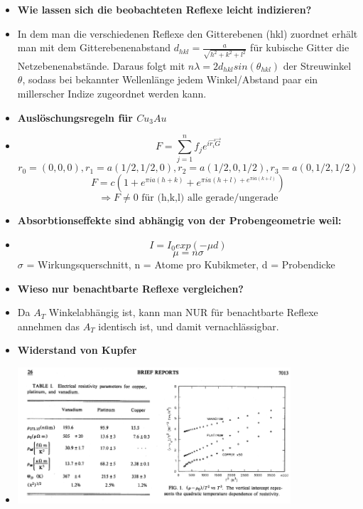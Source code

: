 \begin{itemize}
    \item \textbf{Wie lassen sich die beobachteten Reflexe leicht indizieren?}
    \item {In dem man die verschiedenen Reflexe den Gitterebenen (hkl) zuordnet erhält man mit dem
            Gitterebenenabstand $d_{hkl}=\frac{a}{\sqrt{h^2+k^2+l^2}}$ für kubische Gitter die Netzebenenabstände.
            Daraus folgt mit $n\lambda = 2d_{hkl}sin(\theta_{hkl})$ der Streuwinkel $\theta$, sodass bei 
            bekannter Wellenlänge jedem Winkel/Abstand paar ein millerscher Indize zugeordnet werden kann.}
    \item \textbf{Auslöschungsregeln für $Cu_3Au$}
    \item
                $$F = \sum_{j=1}^n f_j e^{i \vec{r_i} \vec{G}}$$ %
                $$r_0 = (0,0,0), r_1=a(1/2,1/2,0), r_2=a(1/2,0,1/2), r_3=a(0,1/2,1/2)$$%
                $$F = c(1+e^{\pi i a (h+k)}+e^{\pi i a (h+l)+e^{\pi i a (k+l)}})$$%
                $$\Rightarrow F \neq \text{0 für (h,k,l) alle gerade/ungerade} $$  
    \item \textbf{Absorbtionseffekte sind abhängig von der Probengeometrie weil:}
    \item $$I = I_0 exp(-\mu d)$$
          $$\mu = n \sigma$$
          $\sigma$ = Wirkungsquerschnitt, n = Atome pro Kubikmeter, d = Probendicke
    \item \textbf{Wieso nur benachtbarte Reflexe vergleichen?}
    \item Da $A_T$ Winkelabhängig ist, kann man NUR für benachtbarte Reflexe annehmen das $A_T$
          identisch ist, und damit vernachlässigbar.
    \item \textbf{Widerstand von Kupfer}
    \item \includegraphics[width=0.8\textwidth]{images/copperkek.PNG}

\end{itemize}
